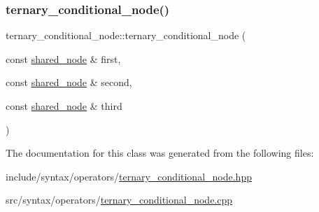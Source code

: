 \subsubsection{\texorpdfstring{ternary\+\_\+conditional\+\_\+node()}{ternary\_conditional\_node()}}
{\footnotesize\ttfamily ternary\+\_\+conditional\+\_\+node\+::ternary\+\_\+conditional\+\_\+node (\begin{DoxyParamCaption}\item[{const \hyperlink{namespacejawe_a3f307481d921b6cbb50cc8511fc2b544}{shared\+\_\+node} \&}]{first,  }\item[{const \hyperlink{namespacejawe_a3f307481d921b6cbb50cc8511fc2b544}{shared\+\_\+node} \&}]{second,  }\item[{const \hyperlink{namespacejawe_a3f307481d921b6cbb50cc8511fc2b544}{shared\+\_\+node} \&}]{third }\end{DoxyParamCaption})}



The documentation for this class was generated from the following files\+:\begin{DoxyCompactItemize}
\item 
include/syntax/operators/\hyperlink{ternary__conditional__node_8hpp}{ternary\+\_\+conditional\+\_\+node.\+hpp}\item 
src/syntax/operators/\hyperlink{ternary__conditional__node_8cpp}{ternary\+\_\+conditional\+\_\+node.\+cpp}\end{DoxyCompactItemize}
